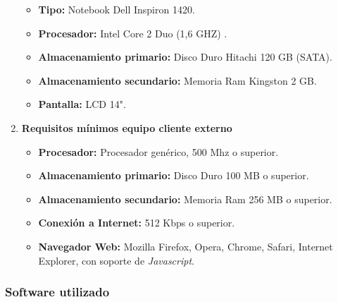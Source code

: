 \documentclass[letterpaper,12pt]{article}
\begin{document}
\begin{enumerate}
\begin{itemize}
\item \textbf{Tipo: }
Notebook Dell Inspiron 1420.
\item \textbf{Procesador: }
Intel Core 2 Duo (1,6 GHZ) .
\item \textbf{Almacenamiento primario: }
Disco Duro Hitachi 120 GB (SATA).
\item \textbf{Almacenamiento secundario: }
Memoria Ram Kingston 2 GB.
\item \textbf{Pantalla: }
LCD 14".
\end{itemize}

\item \textbf{Requisitos mínimos equipo cliente externo}

\begin{itemize}
\item \textbf{Procesador:}
Procesador genérico, 500 Mhz o superior.

\item \textbf{Almacenamiento primario:}
Disco Duro 100 MB o superior.

\item \textbf{Almacenamiento secundario:}
Memoria Ram 256 MB o superior.

\item \textbf{Conexión a Internet:}
512 Kbps o superior.

\item \textbf{Navegador Web:}
Mozilla Firefox, Opera, Chrome, Safari, Internet Explorer, con soporte de 
\emph{Javascript}.
\end{itemize}

\end{enumerate}

\newpage

\subsubsection{Software utilizado}
\end{document}
